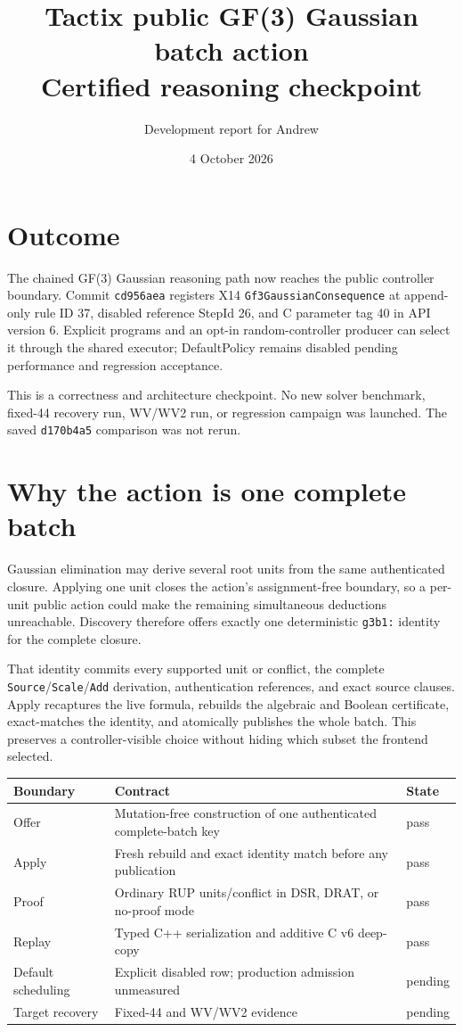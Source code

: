 \documentclass[11pt]{article}
\title{Tactix public GF(3) Gaussian batch action\\Certified reasoning checkpoint}
\author{Development report for Andrew}
\date{4 October 2026}
\newcommand{\code}[1]{\texttt{#1}}
\newcommand{\pending}{\textcolor{orange!70!black}{pending}}
\newcommand{\pass}{\textcolor{green!45!black}{pass}}
\begin{document}
\maketitle

\section*{Outcome}

The chained GF(3) Gaussian reasoning path now reaches the public controller
boundary. Commit \code{cd956aea} registers X14
\code{Gf3GaussianConsequence} at append-only rule ID 37, disabled reference
StepId 26, and C parameter tag 40 in API version 6. Explicit programs and an
opt-in random-controller producer can select it through the shared executor;
DefaultPolicy remains disabled pending performance and regression acceptance.

This is a correctness and architecture checkpoint. No new solver benchmark,
fixed-44 recovery run, WV/WV2 run, or regression campaign was launched. The
saved \code{d170b4a5} comparison was not rerun.

\section*{Why the action is one complete batch}

Gaussian elimination may derive several root units from the same authenticated
closure. Applying one unit closes the action's assignment-free boundary, so a
per-unit public action could make the remaining simultaneous deductions
unreachable. Discovery therefore offers exactly one deterministic
\code{g3b1:} identity for the complete closure.

That identity commits every supported unit or conflict, the complete
\code{Source}/\code{Scale}/\code{Add} derivation, authentication references,
and exact source clauses. Apply recaptures the live formula, rebuilds the
algebraic and Boolean certificate, exact-matches the identity, and atomically
publishes the whole batch. This preserves a controller-visible choice without
hiding which subset the frontend selected.

\begin{center}
\begin{tabularx}{\textwidth}{@{}lXl@{}}
\toprule
Boundary & Contract & State \\
\midrule
Offer & Mutation-free construction of one authenticated complete-batch key &
\pass \\
Apply & Fresh rebuild and exact identity match before any publication & \pass \\
Proof & Ordinary RUP units/conflict in DSR, DRAT, or no-proof mode & \pass \\
Replay & Typed C++ serialization and additive C v6 deep-copy & \pass \\
Default scheduling & Explicit disabled row; production admission unmeasured &
\pending \\
Target recovery & Fixed-44 and WV/WV2 evidence & \pending \\
\bottomrule
\end{tabularx}
\end{center}
\end{document}
